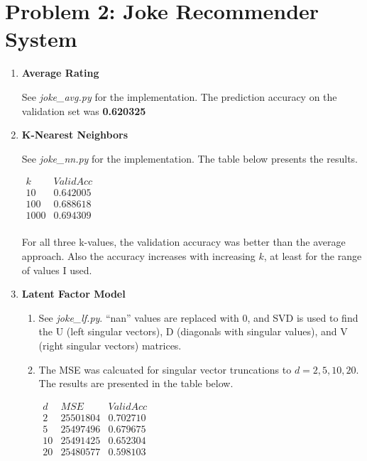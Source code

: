 \documentclass{article}
\begin{document}
\section*{Problem 2: Joke Recommender System}
\begin{enumerate}
  \item \textbf{Average Rating}

    See \textit{joke\_avg.py} for the implementation. The prediction accuracy on the validation set was \textbf{0.620325}
    
  \item \textbf{K-Nearest Neighbors}

    See \textit{joke\_nn.py} for the implementation. The table below presents the results.
    \begin{center}
        $\begin{array}{c|c}
          k    & Valid Acc\\ \hline
          10   & 0.642005  \\
          100  & 0.688618 \\
          1000 & 0.694309 \\
        \end{array}$
    \end{center}
    
  For all three k-values, the validation accuracy was better than the average approach. Also the accuracy increases with increasing $k$, at least for the range of values I used.
        
  \item \textbf{Latent Factor Model}
    \begin{enumerate}
      \item See \textit{joke\_lf.py}. ``nan'' values are replaced with 0, and SVD is used to find the U (left singular vectors), D (diagonals with singular values), and V (right singular vectors) matrices.
      
      \item The MSE was calcuated for singular vector truncations to $d=2,5,10,20$. The results are presented in the table below.
        \begin{center}
        $\begin{array}{c|c|c}
          d  & MSE & Valid Acc\\ \hline
          2  & 25501804 & 0.702710\\
          5  & 25497496 & 0.679675\\
          10 & 25491425 & 0.652304\\
          20 & 25480577 & 0.598103\\
        \end{array}$
        \end{center}
        

\end{enumerate}
\end{enumerate}
\end{document}

